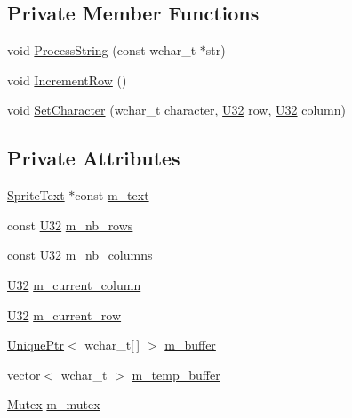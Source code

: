 \subsection*{Private Member Functions}
\begin{DoxyCompactItemize}
\item 
void \hyperlink{classmage_1_1_text_console_script_ac1e1d4768ead2de82493ab487449bbd8}{Process\+String} (const wchar\+\_\+t $\ast$str)
\item 
void \hyperlink{classmage_1_1_text_console_script_a0e82c5d5b84499bf4ed2233cf26145fa}{Increment\+Row} ()
\item 
void \hyperlink{classmage_1_1_text_console_script_a49528daefb63dfc971bf5ad28ad86b55}{Set\+Character} (wchar\+\_\+t character, \hyperlink{namespacemage_a41c104c036fba3756a74e19f793eeaa1}{U32} row, \hyperlink{namespacemage_a41c104c036fba3756a74e19f793eeaa1}{U32} column)
\end{DoxyCompactItemize}
\subsection*{Private Attributes}
\begin{DoxyCompactItemize}
\item 
\hyperlink{classmage_1_1_sprite_text}{Sprite\+Text} $\ast$const \hyperlink{classmage_1_1_text_console_script_a43ef712ae52d2776edba574d32f759bc}{m\+\_\+text}
\item 
const \hyperlink{namespacemage_a41c104c036fba3756a74e19f793eeaa1}{U32} \hyperlink{classmage_1_1_text_console_script_a2d7c8ac463c2c40da2203e395461b800}{m\+\_\+nb\+\_\+rows}
\item 
const \hyperlink{namespacemage_a41c104c036fba3756a74e19f793eeaa1}{U32} \hyperlink{classmage_1_1_text_console_script_a3ca01f143dd099ddddb473e47456a7d8}{m\+\_\+nb\+\_\+columns}
\item 
\hyperlink{namespacemage_a41c104c036fba3756a74e19f793eeaa1}{U32} \hyperlink{classmage_1_1_text_console_script_a3088c94be78946bf0560950afd1f11ec}{m\+\_\+current\+\_\+column}
\item 
\hyperlink{namespacemage_a41c104c036fba3756a74e19f793eeaa1}{U32} \hyperlink{classmage_1_1_text_console_script_a008159a0b02bad789634042469b85240}{m\+\_\+current\+\_\+row}
\item 
\hyperlink{namespacemage_a3316d7143a973e37adf1110f2e80ca31}{Unique\+Ptr}$<$ wchar\+\_\+t\mbox{[}$\,$\mbox{]} $>$ \hyperlink{classmage_1_1_text_console_script_a526410b1b43646948809b772c5446346}{m\+\_\+buffer}
\item 
vector$<$ wchar\+\_\+t $>$ \hyperlink{classmage_1_1_text_console_script_a6500bfd006f5c90d05f3da7f3e8e75a8}{m\+\_\+temp\+\_\+buffer}
\item 
\hyperlink{structmage_1_1_mutex}{Mutex} \hyperlink{classmage_1_1_text_console_script_a7212b01c007fc3d2fd11620c570f1c55}{m\+\_\+mutex}
\end{DoxyCompactItemize}
